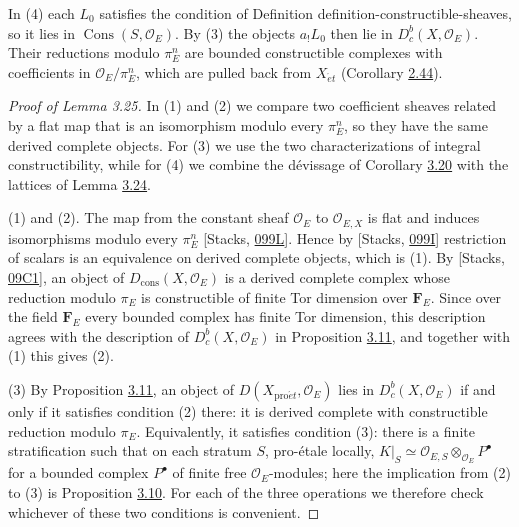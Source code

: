 \documentclass[11pt]{article}
\providecommand{\Cons}{}\renewcommand{\Cons}{\operatorname{Cons}}
\providecommand{\Dbc}{}\renewcommand{\Dbc}{D^b_c}
\providecommand{\Dc}{}\renewcommand{\Dc}{D_{\mathrm{cons}}}
\begin{document}
\label{bp275}%
In (4) each \(L_0\) satisfies the condition of Definition definition-constructible-sheaves, so it lies in \(\Cons(S,\mathcal O_E)\). By (3) the objects \(a_!L_0\) then lie in \(\Dbc(X,\mathcal O_E)\). Their reductions modulo \(\pi_E^n\) are bounded constructible complexes with coefficients in \(\mathcal O_E/\pi_E^n\), which are pulled back from \(X_{\acute{e}t}\) (Corollary \hyperref[bp132]{2.44}).

\begin{proof}[{Proof of Lemma 3.25}]\label{bp276}%
In (1) and (2) we compare two coefficient sheaves related by a flat map that is an isomorphism modulo every \(\pi_E^n\), so they have the same derived complete objects. For (3) we use the two characterizations of integral constructibility, while for (4) we combine the dévissage of Corollary \hyperref[bp253]{3.20} with the lattices of Lemma \hyperref[bp269]{3.24}.

(1) and (2). The map from the constant sheaf \(\mathcal O_E\) to \(\mathcal O_{E,X}\) is flat and induces isomorphisms modulo every \(\pi_E^n\) [Stacks, \href{https://stacks.math.columbia.edu/tag/099L}{099L}]. Hence by [Stacks, \href{https://stacks.math.columbia.edu/tag/099I}{099I}] restriction of scalars is an equivalence on derived complete objects, which is (1). By [Stacks, \href{https://stacks.math.columbia.edu/tag/09C1}{09C1}], an object of \(\Dc(X,\mathcal O_E)\) is a derived complete complex whose reduction modulo \(\pi_E\) is constructible of finite Tor dimension over \(\mathbf F_E\). Since over the field \(\mathbf F_E\) every bounded complex has finite Tor dimension, this description agrees with the description of \(\Dbc(X,\mathcal O_E)\) in Proposition \hyperref[bp226]{3.11}, and together with (1) this gives (2).

(3) By Proposition \hyperref[bp226]{3.11}, an object of \(D(X_{\mathrm{pro}\acute{e}t},\mathcal O_E)\) lies in \(\Dbc(X,\mathcal O_E)\) if and only if it satisfies condition (2) there: it is derived complete with constructible reduction modulo \(\pi_E\). Equivalently, it satisfies condition (3): there is a finite stratification such that on each stratum \(S\), pro-étale locally, \(K|_S\simeq\mathcal O_{E,S}\otimes_{\mathcal O_E}P^\bullet\) for a bounded complex \(P^\bullet\) of finite free \(\mathcal O_E\)-modules; here the implication from (2) to (3) is Proposition \hyperref[bp223]{3.10}. For each of the three operations we therefore check whichever of these two conditions is convenient.


\end{proof}
\end{document}
